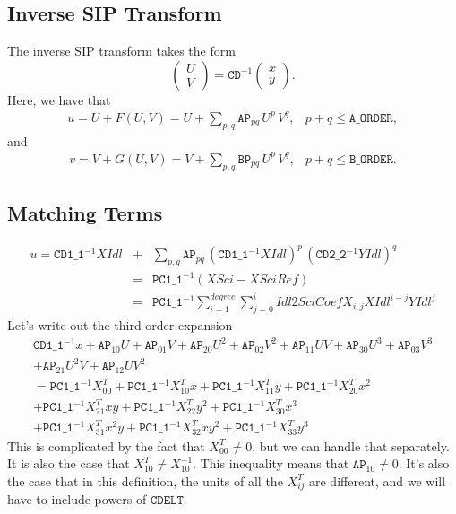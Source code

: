 \documentclass[10pt]{article}
\newcommand{\sipAP}[2]{\ensuremath{\mathtt{AP}_{#1 #2}}}
\newcommand{\sipBP}[2]{\ensuremath{\mathtt{BP}_{#1 #2}}}
\newcommand{\siafXP}[2]{\ensuremath{X^{T}_{#1 #2}}}
\newcommand{\NCu}{\ensuremath{\mathtt{PC1\_1}}}
\newcommand{\CDu}{\ensuremath{\mathtt{CD1\_1}}}
\newcommand{\CDv}{\ensuremath{\mathtt{CD2\_2}}}
\begin{document}
\subsection{Inverse SIP Transform}
The inverse SIP transform takes the form
\begin{equation}
\left(\begin{array}{c}U\\V\end{array}\right) = \mathtt{CD}^{-1} \left(\begin{array}{c} x\\y\end{array}\right).
\end{equation}
Here, we have that 
\begin{eqnarray}
\label{eqn:sip_U}
u = U+F(U,V) = U+\sum_{p,q} \sipAP{p}{q} \,U^p \,V^q, & p+q \leq \mathtt{A\_ORDER},
\end{eqnarray}
\noindent
and
\begin{eqnarray}
\label{eqn:sip_V}
v = V+G(U,V) = V+\sum_{p,q} \sipBP{p}{q} \,U^p \,V^q, & p+q \leq \mathtt{B\_ORDER}.
\end{eqnarray}


\subsection{Matching Terms}
\begin{eqnarray}
u = \CDu^{-1} XIdl &+& \sum_{p,q} \sipAP{p}{q} \,\left(\CDu^{-1} XIdl\right)^p \,\left(\CDv^{-1} YIdl\right)^q \\
&=& \NCu^{-1} (XSci-XSciRef)\\
&=& \NCu^{-1} \sum_{i=1}^{degree} \sum_{j=0}^{i} Idl2SciCoefX_{i,j}XIdl^{i-j}YIdl^j
\end{eqnarray}
\noindent
Let's write out the third order expansion
\begin{eqnarray}
\CDu^{-1} x + \sipAP{1}{0} U + \sipAP{0}{1}V + \sipAP{2}{0}U^2 + \sipAP{0}{2}V^2 + \sipAP{1}{1}UV + \sipAP{3}{0}U^3 + \sipAP{0}{3} V^3 \\
+ \sipAP{2}{1}U^2V + \sipAP{1}{2}UV^2\\
=  \NCu^{-1} \siafXP{0}{0}  + \NCu^{-1} \siafXP{1}{0} x +  \NCu^{-1} \siafXP{1}{1} y + \NCu^{-1} \siafXP{2}{0} x^2 \\
+ \NCu^{-1} \siafXP{2}{1} xy + \NCu^{-1} \siafXP{2}{2} y^2 + \NCu^{-1} \siafXP{3}{0} x^3 \\
+ \NCu^{-1} \siafXP{3}{1} x^2 y + \NCu^{-1} \siafXP{3}{2} x y^2 + \NCu^{-1} \siafXP{3}{3} y^3   
\end{eqnarray}
\noindent
This is complicated by the fact that $\siafXP{0}{0}\ne0$, but we can handle that separately. It is also the case that $\siafXP{1}{0}\ne X_{10}^{-1}$. This inequality means that $\sipAP{1}{0}\ne0$.  It's also the case that in this definition, the units of all the $\siafXP{i}{j}$ are
different, and we will have to include powers of $\mathtt{CDELT}$.
\end{document}

